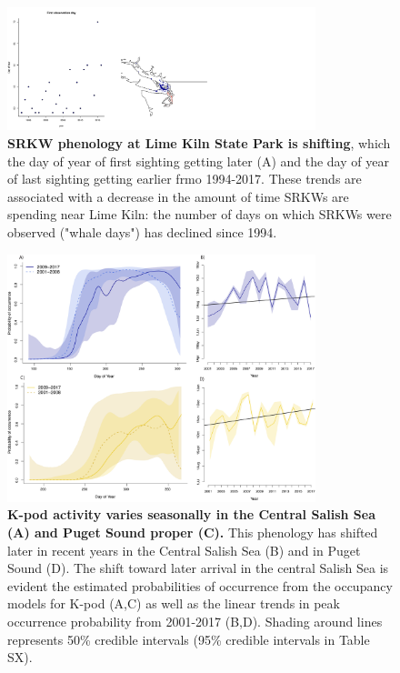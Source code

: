 \documentclass{article}
\begin{document}
\begin{figure}[p]
\includegraphics[width=0.8\textwidth]{../analyses/orcaphen/figures/limekilntrends_dat.pdf} 
\caption{\textbf{SRKW phenology at Lime Kiln State Park is shifting}, which the day of year of first sighting getting later (A) and the day of year of last sighting getting earlier frmo 1994-2017. These trends are associated with a decrease in the amount of time SRKWs are spending near Lime Kiln: the number of days on which SRKWs were observed ("whale days") has declined since 1994. }
\label{fig:limetime}
\end{figure}

\begin{figure}[p]
\includegraphics[width=0.8\textwidth]{../analyses/figures/proboccK_4panels.png} 
\caption{\textbf{K-pod activity varies seasonally in the Central Salish Sea (A) and Puget Sound proper (C).} This phenology has shifted later in recent years in the Central Salish Sea (B) and in Puget Sound (D). The shift toward later arrival in the central Salish Sea is evident the estimated probabilities of occurrence from the occupancy models for K-pod (A,C) as well as the linear trends in peak occurrence probability from 2001-2017 (B,D). Shading around lines represents 50\% credible intervals (95\% credible intervals in Table SX). 
}
\label{fig:Kprobs}
\end{figure}
\end{document}
